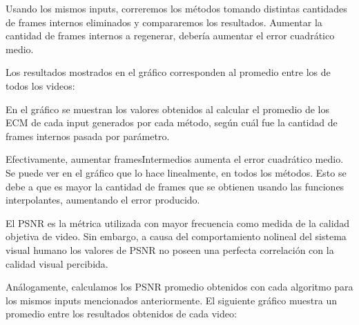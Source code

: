 
\par Usando los mismos inputs, correremos los métodos tomando distintas cantidades de frames internos eliminados y compararemos los resultados. Aumentar la cantidad de frames internos a regenerar, debería aumentar el error cuadrático medio.
\par Los resultados mostrados en el gráfico corresponden al promedio entre los de todos los videos:

\begin{figure}[ht]
	\begin{center}
	\end{center}
\end{figure}

\newpage

\par En el gráfico se muestran los valores obtenidos al calcular el promedio de los ECM de cada input generados por cada método, según cuál fue la cantidad de frames internos pasada por parámetro.
\par Efectivamente, aumentar framesIntermedios aumenta el error cuadrático medio. Se puede ver en el gráfico que lo hace linealmente, en todos los métodos. Esto se debe a que es mayor la cantidad de frames que se obtienen usando las funciones interpolantes, aumentando el error producido.


\par El PSNR es la métrica utilizada con mayor frecuencia como medida de la calidad objetiva de video. Sin embargo, a causa del comportamiento nolineal del sistema visual humano los valores de PSNR no poseen una perfecta correlación con la calidad visual percibida. 
\par Análogamente, calculamos los PSNR promedio obtenidos con cada algoritmo para los mismos inputs mencionados anteriormente. El siguiente gráfico muestra un promedio entre los resultados obtenidos de cada video:

